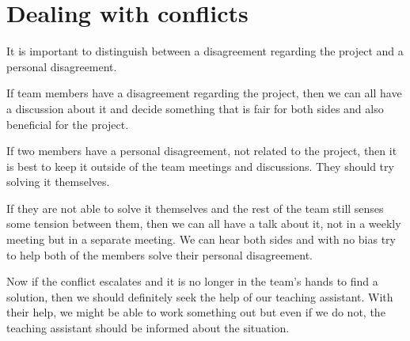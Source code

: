\section{Dealing with conflicts}

It is important to distinguish between a disagreement regarding the project and a personal disagreement.

If team members have a disagreement regarding the project,
then we can all have a discussion about it and decide something that is fair for both sides and also beneficial for the project.

If two members have a personal disagreement, not related to the project,
then it is best to keep it outside of the team meetings and discussions. They should try solving it themselves.

If they are not able to solve it themselves and the rest of the team still senses some tension between them,
then we can all have a talk about it, not in a weekly meeting but in a separate meeting.
We can hear both sides and with no bias try to help both of the members solve their personal disagreement.

Now if the conflict escalates and it is no longer in the team's hands to find a solution,
then we should definitely seek the help of our teaching assistant.
With their help, we might be able to work something out but even if we do not, the teaching assistant should be informed about the situation.